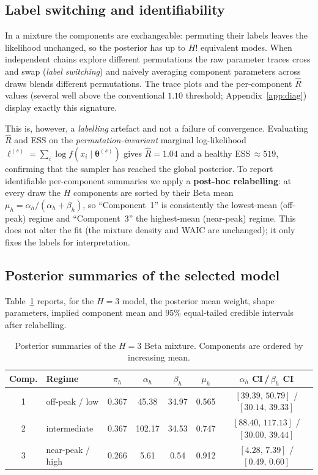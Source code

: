 \documentclass{article}
\newcommand{\bestH}{3}
\newcommand{\piA}{0.367}\newcommand{\alA}{45.38}\newcommand{\beA}{34.97}\newcommand{\muA}{0.565}
\newcommand{\piB}{0.367}\newcommand{\alB}{102.17}\newcommand{\beB}{34.53}\newcommand{\muB}{0.747}
\newcommand{\piC}{0.266}\newcommand{\alC}{5.61}\newcommand{\beC}{0.54}\newcommand{\muC}{0.912}
\newcommand{\rhatlik}{1.04}
\newcommand{\esslik}{519}
\begin{document}
\subsection{Label switching and identifiability}
\label{sec:diag}

In a mixture the components are exchangeable: permuting their labels leaves
the likelihood unchanged, so the posterior has up to $H!$ equivalent modes.
When independent chains explore different permutations the raw parameter
traces cross and swap (\emph{label switching}) and naively averaging
component parameters across draws blends different permutations. The trace
plots and the per-component $\widehat R$ values (several well above the
conventional $1.10$ threshold; Appendix~\ref{app:diag}) display exactly this
signature.

This is, however, a \emph{labelling} artefact and not a failure of
convergence. Evaluating $\widehat R$ and ESS on the
\emph{permutation-invariant} marginal log-likelihood
$\ell^{(s)}=\sum_i\log f(x_i\mid\bm\theta^{(s)})$ gives
$\widehat R=\rhatlik$ and a healthy ESS$\,\approx\esslik$, confirming that
the sampler has reached the global posterior. To report identifiable
per-component summaries we apply a \textbf{post-hoc relabelling}: at every
draw the $H$ components are sorted by their Beta mean
$\mu_h=\alpha_h/(\alpha_h+\beta_h)$, so ``Component~1'' is consistently the
lowest-mean (off-peak) regime and ``Component~3'' the highest-mean
(near-peak) regime. This does not alter the fit (the mixture density and
WAIC are unchanged); it only fixes the labels for interpretation.

\subsection{Posterior summaries of the selected model}

Table~\ref{tab:comp} reports, for the $H=\bestH$ model, the posterior mean
weight, shape parameters, implied component mean and $95\%$ equal-tailed
credible intervals after relabelling.

\begin{table}[H]
\centering
\caption{Posterior summaries of the $H=\bestH$ Beta mixture. Components are
ordered by increasing mean.}
\label{tab:comp}
\begin{tabular}{clccccc}
\toprule
Comp. & Regime & $\pi_h$ & $\alpha_h$ & $\beta_h$ & $\mu_h$ &
$\alpha_h$ CI\,/\,$\beta_h$ CI\\
\midrule
1 & off-peak / low   & \piA & \alA & \beA & \muA & $[39.39,\,50.79]$ / $[30.14,\,39.33]$\\
2 & intermediate     & \piB & \alB & \beB & \muB & $[88.40,\,117.13]$ / $[30.00,\,39.44]$\\
3 & near-peak / high & \piC & \alC & \beC & \muC & $[4.28,\,7.39]$ / $[0.49,\,0.60]$\\
\bottomrule
\end{tabular}
\end{table}
\end{document}
